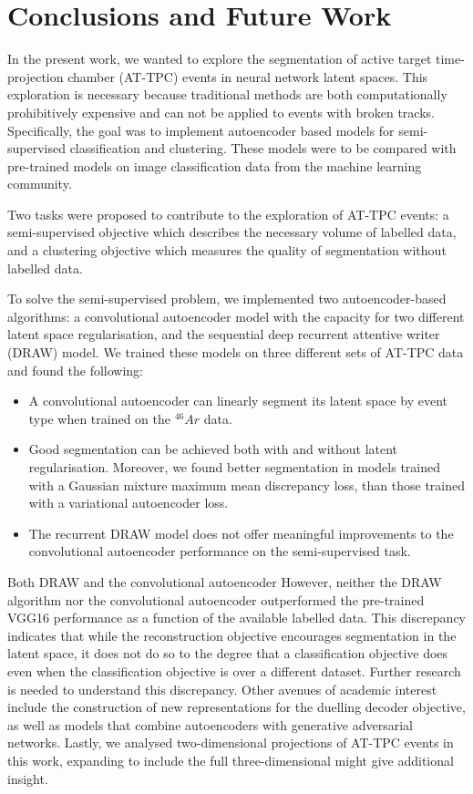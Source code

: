 \chapter{Conclusions and Future Work}


In the present work, we wanted to explore the segmentation of active target time-projection chamber (AT-TPC) events in neural network latent spaces. This exploration is necessary because traditional methods are both computationally prohibitively expensive and can not be applied to events with broken tracks. Specifically, the goal was to implement autoencoder based models for semi-supervised classification and clustering. These models were to be compared with pre-trained models on image classification data from the machine learning community.

Two tasks were proposed to contribute to the exploration of  AT-TPC events: a semi-supervised objective which describes the necessary volume of labelled data, and a clustering objective which measures the quality of segmentation without labelled data. 

To solve the semi-supervised problem, we implemented two autoencoder-based algorithms: a convolutional autoencoder model with the capacity for two different latent space regularisation, and the sequential deep recurrent attentive writer (DRAW) model. We trained these models on three different sets of AT-TPC data and found the following:

\begin{itemize}
\item A convolutional autoencoder can linearly segment its latent space by event type when trained on the ${}^{46}Ar$ data.
\item Good segmentation can be achieved both with and without latent regularisation.  Moreover, we found better segmentation in models trained with a Gaussian mixture maximum mean discrepancy loss, than those trained with a variational autoencoder loss. 
\item The recurrent DRAW  model does not offer meaningful improvements to the convolutional autoencoder performance on the semi-supervised task. 
\end{itemize}

Both DRAW and the convolutional autoencoder 
However, neither the DRAW algorithm nor the convolutional autoencoder outperformed the pre-trained VGG16 performance as a function of the available labelled data. This discrepancy indicates that while the reconstruction objective encourages segmentation in the latent space, it does not do so to the degree that a classification objective does even when the classification objective is over a different dataset. Further research is needed to understand this discrepancy. Other avenues of academic interest include the construction of new representations for the duelling decoder objective, as well as models that combine autoencoders with generative adversarial networks.  Lastly, we analysed two-dimensional projections of AT-TPC events in this work, expanding to include the full three-dimensional might give additional insight.

